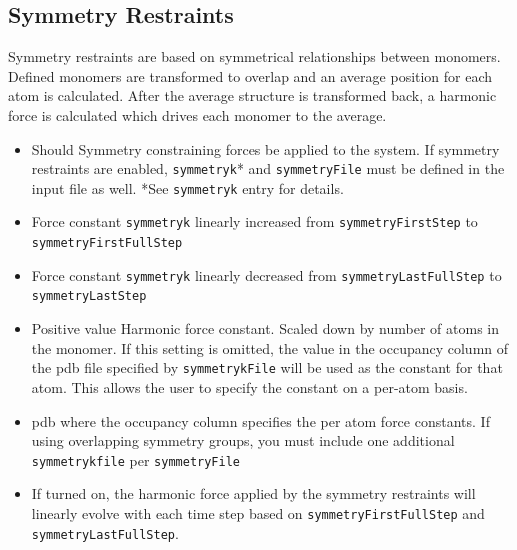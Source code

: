 \subsection{Symmetry Restraints}
Symmetry restraints are based on symmetrical relationships
between monomers.  Defined monomers are transformed to overlap
and an average position for each atom is calculated.  After the average 
structure is transformed back, a harmonic force is calculated which 
drives each monomer to the average.

\begin{itemize}
\item
{}
{Should Symmetry constraining forces be applied to the system.  If symmetry restraints are enabled,
{\tt symmetryk}* and {\tt symmetryFile} must be defined in the 
input file as well.  *See {\tt symmetryk} entry for details.}

\item
{}
{Force constant {\tt symmetryk} linearly increased from {\tt symmetryFirstStep} to {\tt symmetryFirstFullStep}}

\item
{}
{Force constant {\tt symmetryk} linearly decreased from {\tt symmetryLastFullStep} to {\tt symmetryLastStep}} 

\item
{}
{Positive value}
{Harmonic force constant.  Scaled down by number of atoms in the monomer.  If this setting is omitted, the value in the occupancy column
of the pdb file specified by {\tt symmetrykFile} will be used as the constant for that atom.  
This allows the user to specify the constant on a per-atom basis.}

\item
{}
{pdb where the occupancy column specifies the per atom force constants.  If using overlapping
symmetry groups, you must include one additional {\tt symmetrykfile} per {\tt symmetryFile} }

\item
{}
{If turned on, the harmonic force applied by the symmetry restraints will linearly evolve with each time step based on
{\tt symmetryFirstFullStep} and {\tt symmetryLastFullStep}.}


\end{itemize}
